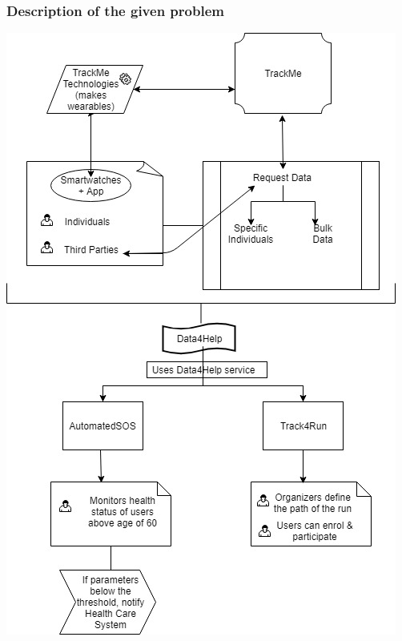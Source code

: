 \documentclass[12pt]{article}
\begin{document}
\subsubsection{Description of the given problem}

\includegraphics[scale=0.50]{Diagrams/High_level.jpg}
\\
\\
\end{document}
